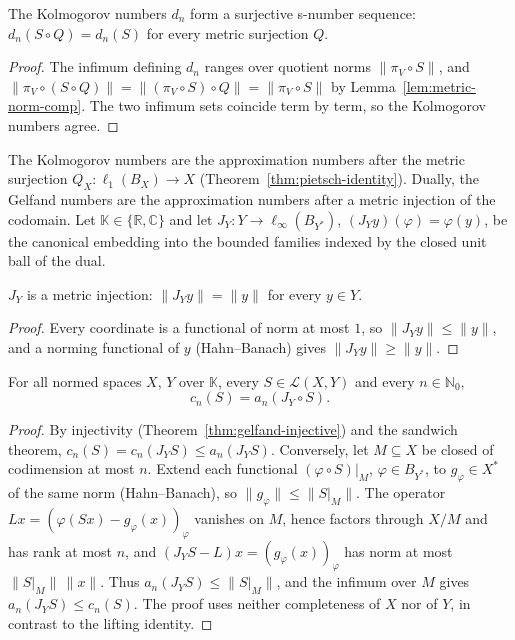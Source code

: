 \begin{theorem}
\label{thm:kolmogorov-surjective}
\leanok
{}
The Kolmogorov numbers $d_n$ form a surjective s-number sequence:
$d_n(S \circ Q) = d_n(S)$ for every metric surjection $Q$.
\end{theorem}
\begin{proof}
\leanok
{}
The infimum defining $d_n$ ranges over quotient norms
$\|\pi_V \circ S\|$, and
$\|\pi_V \circ (S \circ Q)\| = \|(\pi_V \circ S) \circ Q\| = \|\pi_V \circ S\|$
by Lemma~\ref{lem:metric-norm-comp}. The two infimum sets coincide term by
term, so the Kolmogorov numbers agree.
\end{proof}

The Kolmogorov numbers are the approximation numbers after the metric surjection
$Q_X : \ell_1(B_X) \to X$ (Theorem~\ref{thm:pietsch-identity}). Dually, the Gelfand
numbers are the approximation numbers after a metric injection of the codomain. Let
$\mathbb{K} \in \{\mathbb{R}, \mathbb{C}\}$ and let
$J_Y : Y \to \ell_\infty(B_{Y^*})$, $(J_Y y)(\varphi) = \varphi(y)$, be the canonical
embedding into the bounded families indexed by the closed unit ball of the dual.

\begin{lemma}
\label{lem:canonical-embedding}
\leanok
{}
$J_Y$ is a metric injection: $\|J_Y y\| = \|y\|$ for every $y \in Y$.
\end{lemma}
\begin{proof}
\leanok
Every coordinate is a functional of norm at most $1$, so $\|J_Y y\| \le \|y\|$, and a
norming functional of $y$ (Hahn--Banach) gives $\|J_Y y\| \ge \|y\|$.
\end{proof}

\begin{theorem}
\label{thm:pietsch-embedding}
\leanok
{}
For all normed spaces $X$, $Y$ over $\mathbb{K}$, every $S \in \mathcal{L}(X, Y)$ and
every $n \in \mathbb{N}_0$,
\[
  c_n(S) = a_n(J_Y \circ S) .
\]
\end{theorem}
\begin{proof}
\leanok
{}
By injectivity (Theorem~\ref{thm:gelfand-injective}) and the sandwich theorem,
$c_n(S) = c_n(J_Y S) \le a_n(J_Y S)$. Conversely, let $M \subseteq X$ be closed of
codimension at most $n$. Extend each functional $(\varphi \circ S)|_M$,
$\varphi \in B_{Y^*}$, to $g_\varphi \in X^*$ of the same norm (Hahn--Banach), so
$\|g_\varphi\| \le \|S|_M\|$. The operator $L x = (\varphi(S x) - g_\varphi(x))_\varphi$
vanishes on $M$, hence factors through $X/M$ and has rank at most $n$, and
$(J_Y S - L)x = (g_\varphi(x))_\varphi$ has norm at most $\|S|_M\|\,\|x\|$. Thus
$a_n(J_Y S) \le \|S|_M\|$, and the infimum over $M$ gives $a_n(J_Y S) \le c_n(S)$.
The proof uses neither completeness of $X$ nor of $Y$, in contrast to the lifting
identity.
\end{proof}

